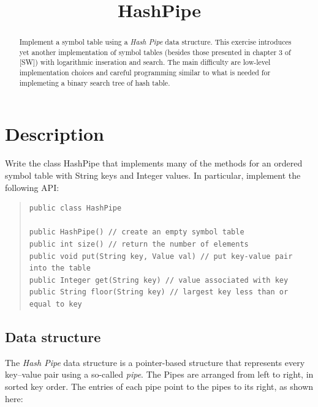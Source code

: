 \documentclass{tufte-handout}
\title{HashPipe}
\author{}
\begin{document}
\maketitle

\begin{abstract}
  Implement a symbol table using a \emph{Hash Pipe} data structure.
  This exercise introduces yet another implementation of symbol tables (besides those presented in chapter 3 of [SW]) with logarithmic inseration and search.
  The main difficulty are low-level implementation choices and careful programming  similar to what is needed for implemeting a binary search tree of hash table.
\end{abstract}

\section{Description}

Write the class HashPipe that implements many of the methods for an ordered symbol table with String keys and Integer values. 
In particular, implement the following API:

\begin{quotation}
\begin{fullwidth}\small
\begin{verbatim}
public class HashPipe 

public HashPipe() // create an empty symbol table
public int size() // return the number of elements
public void put(String key, Value val) // put key-value pair into the table
public Integer get(String key) // value associated with key
public String floor(String key) // largest key less than or equal to key 
 \end{verbatim}
\end{fullwidth}
\end{quotation}

\subsection{Data structure}

The \emph{Hash Pipe} data structure is a pointer-based structure that represents every key--value pair using a so-called \emph{pipe}.
The Pipes are arranged from left to right, in sorted key order.
The entries of each pipe point to the pipes to its right, as shown here:
\end{document}
